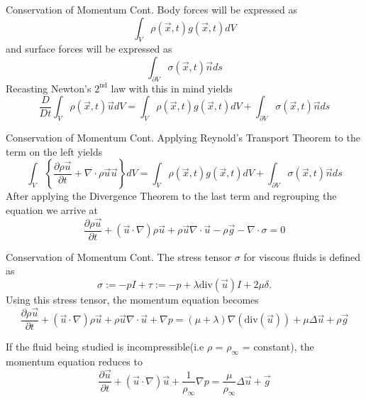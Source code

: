 \documentclass[frames]{prosper}
\begin{document}
\begin{slide}[Dissolve]{Conservation of Momentum Cont.}
Body forces will be expressed as $$ \int_{V} \rho(\stackrel{\rightarrow}{x},t) g(\stackrel{\rightarrow}{x},t)dV $$ and surface forces will be expressed as $$ \int_{\partial V} \sigma(\stackrel{\rightarrow}{x},t)\stackrel{\rightarrow}{n}ds $$
Recasting Newton's $2^{\mbox{nd}}$ law with this in mind yields $$ \frac{D}{Dt} \int_{V} \rho(\stackrel{\rightarrow}{x},t) \stackrel{\rightarrow}{u}dV = \int_{V} \rho(\stackrel{\rightarrow}{x},t) g(\stackrel{\rightarrow}{x},t)dV + \int_{\partial V} \sigma(\stackrel{\rightarrow}{x},t)\stackrel{\rightarrow}{n}ds $$
\end{slide}

\begin{slide}[Dissolve]{Conservation of Momentum Cont.}
Applying Reynold's Transport Theorem to the term on the left yields $$ \int_{V} \left\{\frac{\partial \rho \stackrel{\rightarrow}{u}}{\partial t} + \nabla \cdot \rho \stackrel{\rightarrow}{u}\stackrel{\rightarrow}{u}\right\}dV = \int_{V} \rho(\stackrel{\rightarrow}{x},t) g(\stackrel{\rightarrow}{x},t)dV + \int_{\partial V} \sigma(\stackrel{\rightarrow}{x},t)\stackrel{\rightarrow}{n}ds $$
After applying the Divergence Theorem to the last term and regrouping the equation we arrive at $$ \frac{\partial \rho \stackrel{\rightarrow}{u}}{\partial t} + (\stackrel{\rightarrow}{u} \cdot \nabla)\rho\stackrel{\rightarrow}{u} + \rho\stackrel{\rightarrow}{u}\nabla \cdot \stackrel{\rightarrow}{u} - \rho \stackrel{\rightarrow}{g} - \nabla \cdot \sigma = 0 $$
\end{slide}

\begin{slide}[Dissolve]{Conservation of Momentum Cont.}
The stress tensor $\sigma$ for viscous fluids is defined as $$ \sigma := -pI + \tau := -p + \lambda \mbox{div}(\stackrel{\rightarrow}{u})I + 2\mu\delta. $$ Using this stress tensor, the momentum equation becomes $$ \frac{\partial \rho \stackrel{\rightarrow}{u}}{\partial t} + (\stackrel{\rightarrow}{u} \cdot \nabla)\rho\stackrel{\rightarrow}{u} + \rho\stackrel{\rightarrow}{u}\nabla\cdot \stackrel{\rightarrow}{u} + \nabla p = (\mu + \lambda)\nabla(\mbox{div}(\stackrel{\rightarrow}{u})) + \mu\Delta\stackrel{\rightarrow}{u} + \rho\stackrel{\rightarrow}{g} $$

If the fluid being studied is incompressible(i.e $\rho$ = $\rho_{\infty}$ = constant), the momentum equation reduces to $$ \frac{\partial \stackrel{\rightarrow}{u}}{\partial t} + (\stackrel{\rightarrow}{u} \cdot \nabla)\stackrel{\rightarrow}{u} + \frac{1}{\rho_{\infty}}\nabla p = \frac{\mu}{\rho_{\infty}}\Delta\stackrel{\rightarrow}{u} + \stackrel{\rightarrow}{g} $$
\end{slide}
\end{document}
